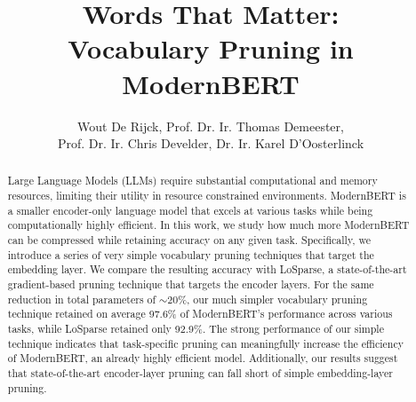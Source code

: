\documentclass[twocolumn]{article}
\title{\huge \textbf{Words That Matter:\\ Vocabulary Pruning in ModernBERT}}
\author{Wout De Rijck, Prof. Dr. Ir. Thomas Demeester, \\ Prof. Dr. Ir. Chris Develder, Dr. Ir. Karel D'Oosterlinck}
\date{} %
\begin{document}
\maketitle

\begin{abstract}

Large Language Models (LLMs) require substantial computational and memory resources, limiting their utility in resource constrained environments. 
ModernBERT is a smaller encoder-only language model that excels at various tasks while being computationally highly efficient. 
In this work, we study how much more ModernBERT can be compressed while retaining accuracy on any given task.
Specifically, we introduce a series of very simple vocabulary pruning techniques that target the embedding layer. We compare the resulting accuracy with LoSparse, a state-of-the-art gradient-based pruning technique that targets the encoder layers.
For the same reduction in total parameters of $\sim$20\%, our much simpler vocabulary pruning technique retained on average 97.6\% of ModernBERT's performance across various tasks, while LoSparse retained only 92.9\%.
The strong performance of our simple technique indicates that task-specific pruning can meaningfully increase the efficiency of ModernBERT, an already highly efficient model. Additionally, our results suggest that state-of-the-art encoder-layer pruning can fall short of simple embedding-layer pruning.

\end{abstract}
\end{document}

